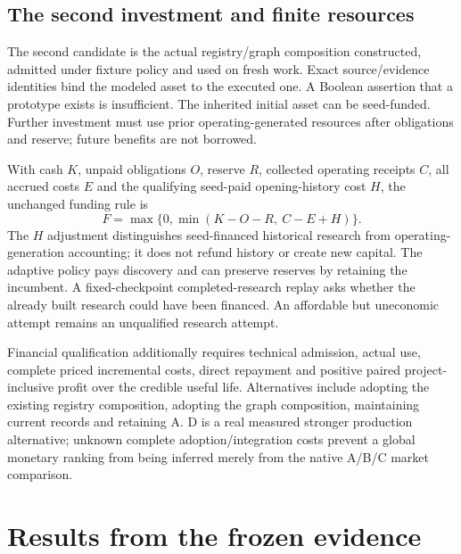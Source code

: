 \documentclass[11pt,a4paper]{article}
\begin{document}
\subsection{The second investment and finite resources}
The second candidate is the actual registry/graph composition constructed, admitted under fixture policy and used on fresh work. Exact source/evidence identities bind the modeled asset to the executed one. A Boolean assertion that a prototype exists is insufficient. The inherited initial asset can be seed-funded. Further investment must use prior operating-generated resources after obligations and reserve; future benefits are not borrowed.

With cash $K$, unpaid obligations $O$, reserve $R$, collected operating receipts $C$, all accrued costs $E$ and the qualifying seed-paid opening-history cost $H$, the unchanged funding rule is
\begin{equation}
F=\max\{0,\min(K-O-R,\ C-E+H)\}.
\end{equation}
The $H$ adjustment distinguishes seed-financed historical research from operating-generation accounting; it does not refund history or create new capital. The adaptive policy pays discovery and can preserve reserves by retaining the incumbent. A fixed-checkpoint completed-research replay asks whether the already built research could have been financed. An affordable but uneconomic attempt remains an unqualified research attempt.

Financial qualification additionally requires technical admission, actual use, complete priced incremental costs, direct repayment and positive paired project-inclusive profit over the credible useful life. Alternatives include adopting the existing registry composition, adopting the graph composition, maintaining current records and retaining A. D is a real measured stronger production alternative; unknown complete adoption/integration costs prevent a global monetary ranking from being inferred merely from the native A/B/C market comparison.

\section{Results from the frozen evidence}
\label{sec:results}


\begin{table}[htbp]
\caption{Executed production. Primary means include allocated initialization; the three designed stresses remain separate. Times are descriptive seconds on this host.}
\label{tab:production}
\small
\end{table}
\end{document}
